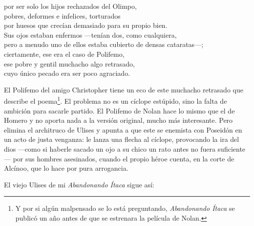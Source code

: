 \begin{versopropio}
por ser solo los hijos rechazados del Olimpo,\\
pobres, deformes e infelices, torturados\\
por huesos que crecían demasiado para su propio bien.\\
Sus ojos estaban enfermos ---tenían dos, como cualquiera,\\
pero a menudo uno de ellos estaba cubierto de densas cataratas---;\\
ciertamente, ese era el caso de Polifemo,\\
ese pobre y gentil muchacho algo retrasado,\\
cuyo único pecado era ser poco agraciado.
\end{versopropio}

El Polifemo del amigo Christopher tiene un eco de este muchacho retrasado que describe el poema\footnote{Y por si algún malpensado se lo está preguntando, \emph{Abandonando Ítaca} se publicó un año antes de que se estrenara la película de Nolan.}. El problema no es un cíclope estúpido, sino la falta de ambición para sacarle partido. El Polifemo de Nolan hace lo mismo que el de Homero y no aporta nada a la versión original, mucho más interesante. Pero elimina el architruco de Ulises y apunta a que este se enemista con Poseidón en un acto de justa venganza: le lanza una flecha al cíclope, provocando la ira del dios ---como si haberle sacado un ojo a su chico un rato antes no fuera suficiente--- por sus hombres asesinados, cuando el propio héroe cuenta, en la corte de Alcínoo, que lo hace por pura arrogancia.

El viejo Ulises de mi \emph{Abandonando Ítaca} sigue así:

